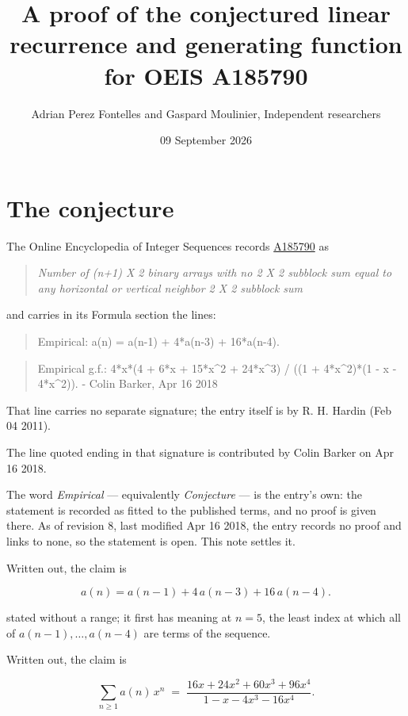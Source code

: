 \documentclass[11pt]{article}
\title{A proof of the conjectured linear recurrence and generating function for OEIS A185790}
\author{Adrian Perez Fontelles and Gaspard Moulinier, Independent researchers}
\date{09 September 2026}
\theoremstyle{definition}
\begin{document}
\maketitle
\section{The conjecture}

The Online Encyclopedia of Integer Sequences records \href{https://oeis.org/A185790}{A185790} as

\begin{quote}\itshape Number of (n+1) X 2 binary arrays with no 2 X 2 subblock sum equal to any horizontal or vertical neighbor 2 X 2 subblock sum\end{quote}

and carries in its Formula section the lines:

\begin{quote}\ttfamily Empirical: a(n) = a(n-1) + 4*a(n-3) + 16*a(n-4).\end{quote}

\begin{quote}\ttfamily Empirical g.f.: 4*x*(4 + 6*x + 15*x\textasciicircum{}2 + 24*x\textasciicircum{}3) / ((1 + 4*x\textasciicircum{}2)*(1 - x - 4*x\textasciicircum{}2)). - Colin Barker, Apr 16 2018\end{quote}

That line carries no separate signature; the entry itself is by R. H. Hardin (Feb 04 2011).

The line quoted ending in that signature is contributed by Colin Barker on Apr 16 2018.

The word {\itshape Empirical} --- equivalently {\itshape Conjecture} --- is the entry's own: the statement is recorded as fitted to the published terms, and no proof is given there. As of revision 8, last modified Apr 16 2018, the entry records no proof and links to none, so the statement is open. This note settles it.

Written out, the claim is

\[a(n) = a(n-1) + 4\,a(n-3) + 16\,a(n-4).\]

stated without a range; it first has meaning at $n = 5$, the least index at which all of $a(n-1),\dots,a(n-4)$ are terms of the sequence.

Written out, the claim is

\[\sum_{n \ge 1} a(n)\,x^n \;=\; \frac{16x + 24x^{2} + 60x^{3} + 96x^{4}}{1 - x - 4x^{3} - 16x^{4}}.\]
\end{document}
